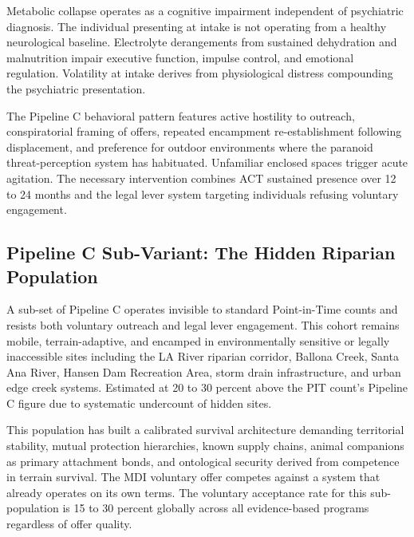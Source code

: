 \documentclass[12pt, letterpaper]{article}
\begin{document}
Metabolic collapse operates as a cognitive impairment independent of psychiatric diagnosis. The individual presenting at intake is not operating from a healthy neurological baseline. Electrolyte derangements from sustained dehydration and malnutrition impair executive function, impulse control, and emotional regulation. Volatility at intake derives from physiological distress compounding the psychiatric presentation.

The Pipeline C behavioral pattern features active hostility to outreach, conspiratorial framing of offers, repeated encampment re-establishment following displacement, and preference for outdoor environments where the paranoid threat-perception system has habituated. Unfamiliar enclosed spaces trigger acute agitation. The necessary intervention combines ACT sustained presence over 12 to 24 months and the legal lever system targeting individuals refusing voluntary engagement.

\subsection{Pipeline C Sub-Variant: The Hidden Riparian Population}

A sub-set of Pipeline C operates invisible to standard Point-in-Time counts and resists both voluntary outreach and legal lever engagement. This cohort remains mobile, terrain-adaptive, and encamped in environmentally sensitive or legally inaccessible sites including the LA River riparian corridor, Ballona Creek, Santa Ana River, Hansen Dam Recreation Area, storm drain infrastructure, and urban edge creek systems. Estimated at 20 to 30 percent above the PIT count's Pipeline C figure due to systematic undercount of hidden sites.

This population has built a calibrated survival architecture demanding territorial stability, mutual protection hierarchies, known supply chains, animal companions as primary attachment bonds, and ontological security derived from competence in terrain survival. The MDI voluntary offer competes against a system that already operates on its own terms. The voluntary acceptance rate for this sub-population is 15 to 30 percent globally across all evidence-based programs regardless of offer quality.
\end{document}
